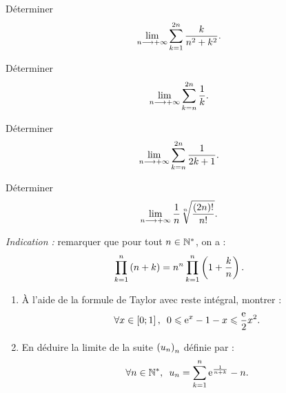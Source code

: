 \begin{exo}[Exercice 14]
Déterminer \[\lim_{n\longrightarrow+\infty}\sum_{k=1}^{2n}\dfrac{k}{n^2+k^2}.\]
\end{exo}

\begin{corr}
\end{corr}

\begin{exo}[Exercice 15]
Déterminer \[\lim_{n\longrightarrow+\infty}\sum_{k=n}^{2n}\dfrac{1}{k}.\]
\end{exo}

\begin{corr}
\end{corr}

\begin{exo}[Exercice 16]
Déterminer \[\lim_{n\longrightarrow+\infty}\sum_{k=n}^{2n}\dfrac{1}{2k+1}.\]
\end{exo}

\begin{corr}
\end{corr}

\begin{exo}[Exercice 17]
Déterminer \[\lim_{n\longrightarrow+\infty}\dfrac{1}{n}\sqrt[n]{\dfrac{\left(2n\right)!}{n!}}.\]

\textit{Indication :} remarquer que pour tout \(n\in\mathbb{N}^*\), on a : \[\prod_{k=1}^n\left(n+k\right)=n^n\prod_{k=1}^n\left(1+\dfrac{k}{n}\right).\]
\end{exo}

\begin{corr}
\end{corr}

\begin{exo}
\begin{enumerate}
\item À l'aide de la formule de Taylor avec reste intégral, montrer : \[\quantifs{\forall x\in\intervii{0}{1}}0\leq\e{x}-1-x\leq\dfrac{\e{}}{2}x^2.\]

\item En déduire la limite de la suite \(\left(u_n\right)_n\) définie par : \[\quantifs{\forall n\in\Ns}u_n=\sum_{k=1}^n\e{\frac{1}{n+k}}-n.\]
\end{enumerate}
\end{exo}

\begin{corr}
\end{corr}